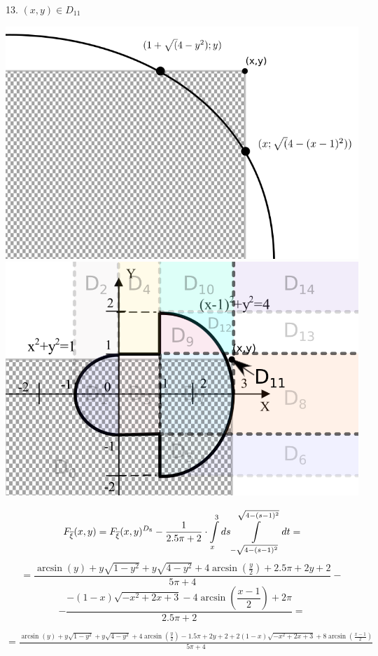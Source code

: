 \documentclass[14pt,a4paper]{scrartcl}
\theoremstyle{definition}
\theoremstyle{remark}
\theoremstyle{definition}
\theoremstyle{definition}
\begin{document}
13. $(x,y) \in D_{11}$
\begin{center} \includegraphics[scale=0.3]{assets/zones13111.png}\includegraphics[scale=0.27]{assets/zone13113.png} \end{center}
$$
F_{\overline{\xi}} (x,y) = F_{\overline{\xi}}(x,y)^{D_8} -  \frac{1}{2.5\pi + 2} \cdot
 \int\limits_{x}^{3}{ds  \int\limits_{-\sqrt{4 - (s-1)^2}}^{ \sqrt{4 - (s-1)^2}}{dt}} =
$$
$$
 = \frac{\arcsin\left(y\right)+y\sqrt{1-y^2}+  y  \sqrt{4-y^2}+4\arcsin\left(\frac{y}{2}\right) + 2.5\pi + 2y + 2}{5\pi + 4} -
 $$
 $$- \frac{-\left(1-x\right)\sqrt{-x^2+2x+3}-4\arcsin\left(\dfrac{x-1}{2}\right)+2{\pi}}{2.5\pi + 2} =
$$
\begin{center}
$
= \frac{\arcsin\left(y\right)+y\sqrt{1-y^2}+  y  \sqrt{4-y^2}+4\arcsin\left(\frac{y}{2}\right)-  1.5\pi + 2y + 2 +2\left(1-x\right)\sqrt{-x^2+2x+3}+8\arcsin\left(\frac{x-1}{2}\right) }{5\pi + 4}
$
\end{center}
\end{document}
